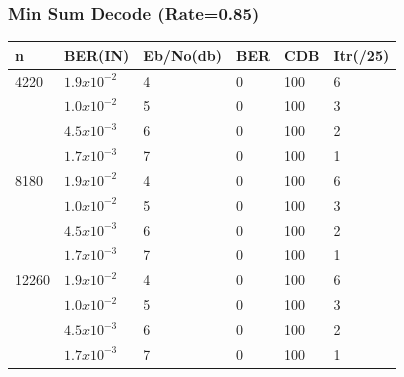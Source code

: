 \documentclass[xcolor=dvipsname]
{beamer}
\begin{document}
\begin{frame}[t] 
\frametitle{Min Sum Decode (Rate=0.85)}

\begin{table}[]
\centering
\begin{tabular}{|l|l|l|l|l|l|}
\hline
n     & BER(IN) & Eb/No(db) & BER & CDB & Itr(/25) \\ \hline
4220  & $1.9x10^{-2}$ & 4     & 0   & 100 & 6         \\ \hline
	  & $1.0x10^{-2}$ & 5     & 0   & 100 & 3         \\
      & $4.5x10^{-3}$ & 6     & 0   & 100 & 2         \\ 
      & $1.7x10^{-3}$ & 7     & 0   & 100 & 1         \\ \hline
8180  & $1.9x10^{-2}$ & 4     & 0   & 100 & 6         \\  \hline
      & $1.0x10^{-2}$ & 5     & 0   & 100 & 3         \\ 
      & $4.5x10^{-3}$ & 6     & 0   & 100 & 2         \\ 
      & $1.7x10^{-3}$ & 7     & 0   & 100 & 1         \\ \hline
12260 & $1.9x10^{-2}$ & 4     & 0   & 100 & 6         \\  \hline
      & $1.0x10^{-2}$ & 5     & 0   & 100 & 3         \\ 
      & $4.5x10^{-3}$ & 6     & 0   & 100 & 2         \\ 
      & $1.7x10^{-3}$ & 7     & 0   & 100 & 1         \\ \hline
\end{tabular}
\end{table}
\end{frame}
\end{document}
